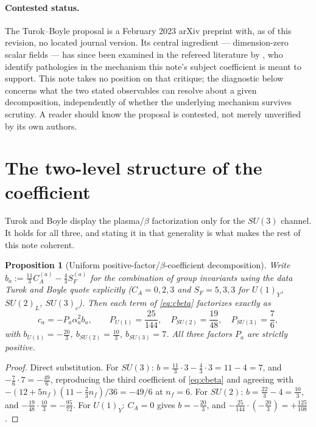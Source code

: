 \documentclass[11pt]{article}
\newtheorem{proposition}[theorem]{Proposition}
\theoremstyle{definition}
\theoremstyle{remark}
\begin{document}
\paragraph{Contested status.} The Turok--Boyle proposal is a February 2023 arXiv preprint with, as
of this revision, no located journal version. Its central ingredient --- dimension-zero scalar
fields --- has since been examined in the refereed literature by \citet{ClineHell2026}, who
identify pathologies in the mechanism this note's subject coefficient is meant to support. This
note takes no position on that critique; the diagnostic below concerns what the two stated
observables can resolve about a given decomposition, independently of whether the underlying
mechanism survives scrutiny. A reader should know the proposal is contested, not merely unverified
by its own authors.

\section{The two-level structure of the coefficient}
\label{sec:twolevel}

Turok and Boyle display the plasma/$\beta$ factorization only for the $SU(3)$ channel. It holds
for all three, and stating it in that generality is what makes the rest of this note coherent.

\begin{proposition}[Uniform positive-factor/$\beta$-coefficient decomposition]
\label{prop:factorization}
Write $b_a := \tfrac{11}{3}C_A^{(a)} - \tfrac43 S_F^{(a)}$ for the combination of group invariants
using the data Turok and Boyle quote explicitly \citep{TurokBoyle2023} ($C_A = 0,2,3$ and $S_F =
5,3,3$ for $U(1)_Y$, $SU(2)_L$, $SU(3)_c$). Then each term of \eqref{eq:cbeta} factorizes exactly
as
\begin{equation}
c_a = -P_a \alpha_a^2 b_a, \qquad P_{U(1)} = \frac{25}{144}, \quad P_{SU(2)} = \frac{19}{48}, \quad
P_{SU(3)} = \frac76,
\label{eq:factorization}
\end{equation}
with $b_{U(1)} = -\tfrac{20}{3}$, $b_{SU(2)} = \tfrac{10}{3}$, $b_{SU(3)} = 7$. All three factors
$P_a$ are strictly positive.
\end{proposition}

\begin{proof}
Direct substitution. For $SU(3)$: $b = \tfrac{11}{3}\cdot 3 - \tfrac43\cdot 3 = 11-4 = 7$, and
$-\tfrac76\cdot 7 = -\tfrac{49}{6}$, reproducing the third coefficient of \eqref{eq:cbeta} and
agreeing with $-(12+5n_f)(11-\tfrac23 n_f)/36 = -49/6$ at $n_f=6$. For $SU(2)$:
$b = \tfrac{22}{3}-4 = \tfrac{10}{3}$, and $-\tfrac{19}{48}\cdot\tfrac{10}{3} = -\tfrac{95}{72}$.
For $U(1)_Y$: $C_A=0$ gives $b = -\tfrac{20}{3}$, and $-\tfrac{25}{144}\cdot(-\tfrac{20}{3}) =
+\tfrac{125}{108}$.
\end{proof}
\end{document}
